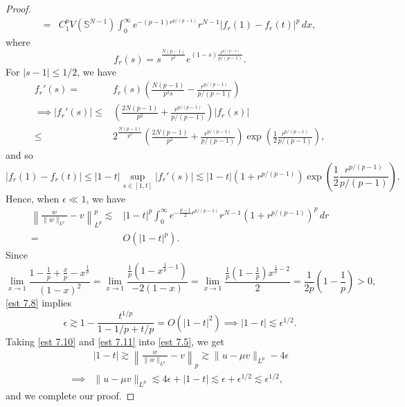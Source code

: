 \documentclass[11pt]{article}
\numberwithin{equation}{section}
\begin{document}
\begin{proof}
\begin{align*}
        ={}& C_1^p V(\mathbb{S}^{N-1}) \int_0^\infty e^{-(p-1)r^{p/(p-1)}}r^{N-1}|f_r(1)-f_r(t)|^p\,dx,
    \end{align*}
    where
    \begin{equation}
        f_r(s) = s^{\frac{N(p-1)}{p^2}}e^{(1-s)\frac{r^{p/(p-1)}}{p/(p-1)}}.
    \end{equation}
    For $|s-1|\le 1/2$, we have
    \begin{align*}
        f_r'(s) ={}& f_r(s) \left(\frac{N(p-1)}{p^2s} - \frac{r^{p/(p-1)}}{p/(p-1)}\right)\\
        \implies |f_r'(s)| \le{}& \left(\frac{2N(p-1)}{p^2} + \frac{r^{p/(p-1)}}{p/(p-1)}\right)|f_r(s)|\\
        \le{}& 2^{\frac{N(p-1)}{p^2}} \left(\frac{2N(p-1)}{p^2} + \frac{r^{p/(p-1)}}{p/(p-1)}\right)\exp\left(\frac 12 \frac{r^{p/(p-1)}}{p/(p-1)}\right),
    \end{align*}
    and so
    \begin{equation}
        |f_r(1)-f_r(t)|\le |1-t|\sup_{s\in[1,t]}|f_r'(s)| \lesssim |1-t|(1+r^{p/(p-1)})\exp\left(\frac 12 \frac{r^{p/(p-1)}}{p/(p-1)}\right).
    \end{equation}
    Hence, when $\epsilon \ll 1$, we have
    \begin{equation}\label{est 7.10}
        \begin{split}
            \left\|\frac{w}{\|w\|_{L^p}}-v\right\|_{L^p}^p \lesssim{}& |1-t|^p \int_0^\infty e^{-\frac{p-1}{2}r^{p/(p-1)}} r^{N-1} (1+r^{p/(p-1)})^p\,dr\\
            ={}& O(|1-t|^p).
        \end{split}
    \end{equation}
    Since
    \begin{equation*}
        \lim_{x\to 1}\frac{1-\frac 1p + \frac xp - x^{\frac 1p}}{(1-x)^2} = \lim_{x\to 1} \frac{\frac 1p\left(1 - x^{\frac 1p -1}\right)}{-2(1-x)} = \lim_{x\to 1}\frac{\frac 1p \left(1-\frac 1p\right) x^{\frac 1p-2}}{2} = \frac{1}{2p}\left(1-\frac 1p\right) >0,
    \end{equation*}
    \eqref{est 7.8} implies
    \begin{equation}\label{est 7.11}
        \epsilon \gtrsim 1-\frac{t^{1/p}}{1-1/p + t/p} = O(|1-t|^2) \implies |1-t|\lesssim \epsilon^{1/2}.
    \end{equation}
    Taking \eqref{est 7.10} and \eqref{est 7.11} into \eqref{est 7.5}, we get
    \begin{equation*}
        \begin{split}
            & |1-t| \gtrsim \left\|\frac{w}{\|w\|_{L^p}}-v\right\|_p \gtrsim \|u-\mu v\|_{L^p}-4\epsilon \\
            \implies{}& \|u-\mu v\|_{L^p} \lesssim 4\epsilon + |1-t| \lesssim \epsilon + \epsilon^{1/2} \lesssim \epsilon^{1/2},
        \end{split}
    \end{equation*}
    and we complete our proof.
\end{proof}
\end{document}
